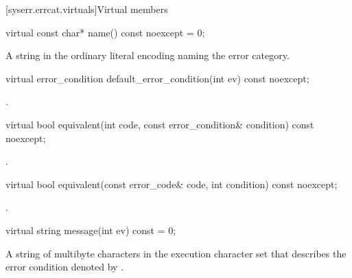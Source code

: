 [syserr.errcat.virtuals]{Virtual members}

%
\begin{itemdecl}
virtual const char* name() const noexcept = 0;
\end{itemdecl}

\begin{itemdescr}
\pnum
\returns
A string in the ordinary literal encoding naming the error category.
\end{itemdescr}

%
\begin{itemdecl}
virtual error_condition default_error_condition(int ev) const noexcept;
\end{itemdecl}

\begin{itemdescr}
\pnum
\returns
{}.
\end{itemdescr}

%
\begin{itemdecl}
virtual bool equivalent(int code, const error_condition& condition) const noexcept;
\end{itemdecl}

\begin{itemdescr}
\pnum
\returns
{}.
\end{itemdescr}

%
\begin{itemdecl}
virtual bool equivalent(const error_code& code, int condition) const noexcept;
\end{itemdecl}

\begin{itemdescr}
\pnum
\returns
{}.
\end{itemdescr}

%
\begin{itemdecl}
virtual string message(int ev) const = 0;
\end{itemdecl}

\begin{itemdescr}
\pnum
\returns
A string of multibyte characters in the execution character set
that describes the error condition denoted by .
\end{itemdescr}

